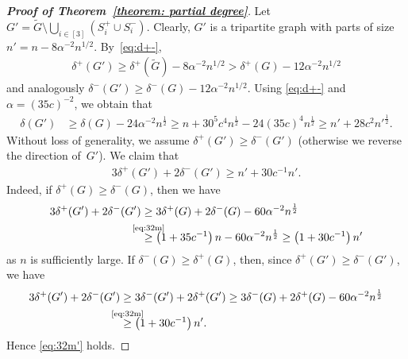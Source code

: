 \documentclass[11pt]{article}
\newcommand{\tG}{\widetilde{G}}
\numberwithin{equation}{section}
\begin{document}
\begin{proof}[\textbf{Proof of Theorem~\ref{theorem: partial degree}}]
Let $G' = \tG \setminus \bigcup_{i\in [3]} (S_i^+\cup S_i^-)$.
Clearly, $G'$ is a tripartite graph with parts of size $n' = n- 8 \alpha^{-2}n^{1/2}$.
By~\eqref{eq:d+-}, 
\begin{align*} 
        \delta^+(G')\ge \delta^+(\tG) - 8 \alpha^{-2}n^{1/2} > \delta^+(G) - 12 \alpha^{-2} n^{1/2}
\end{align*}
and analogously $\delta^-(G') \ge \delta^-(G) - 12 \alpha^{-2} n^{1/2}$. Using \eqref{eq:d+-} and $\alpha = (35c)^{-2}$, we obtain that 
        \begin{align*}
            \delta(G')&\ge \delta(G) - 24 \alpha^{-2} n^{\frac12} \ge n+ 30^5 c^4 n^{\frac{1}{2}} - {24}(35 c)^4 n^{\frac12} 
            \ge n'+ 28c^2n'^{\frac12}. 
        \end{align*}
        Without loss of generality, we assume $\delta^+(G')\ge \delta^-(G')$ (otherwise we reverse the direction of~$G'$). We claim that 
        \begin{align}\label{eq:32m'}
        3\delta^+(G')+2\delta^-(G')\ge n'+30c^{-1}n'.
        \end{align}
        Indeed, if $\delta^+(G)\ge \delta^-(G)$, then we have 
        \begin{align*}
            3\delta^+(G')+2\delta^-(G')&\ge 3\delta^+(G)+2\delta^-(G) - 60\alpha^{-2}n^{\frac12} \\
            &\overset{\mathclap{\text{\eqref{eq:32m}}}}{\ge} \left(1+35c^{-1}\right)n - 60\alpha^{-2}n^{\frac12} \ge \left(1+30c^{-1}\right)n' 
        \end{align*}
        as $n$ is sufficiently large. 
        If $\delta^-(G)\ge \delta^+(G)$, then, since $\delta^+(G')\ge \delta^-(G')$, we have       
         \begin{align*}
            3\delta^+(G')+2\delta^-(G')&\ge 3\delta^-(G')+2\delta^+(G')
            \ge 3\delta^-(G)+2\delta^+(G) - 60 \alpha^{-2} n^{\frac12} \\
          & \overset{\mathclap{\text{\eqref{eq:32m}}}}{\ge} \left(1+30c^{-1}\right)n'. %
        \end{align*}
        Hence \eqref{eq:32m'} holds.

				


\end{proof}
\end{document}
